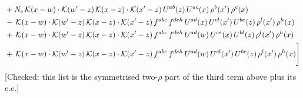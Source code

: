\documentclass[9pt]{article}
\numberwithin{equation}{section}
\begin{document}
\begin{align}
&+N_{c}\,\mathcal{K}(x-w)\cdot\mathcal{K}(w'-z)\,\mathcal{K}(x-z)\cdot\mathcal{K}(x'-z)\,U^{ab}(z)\,U^{ac}(x)\,\rho^{b}(x')\,\rho^{c}(x)\notag \\ 
&-\,\mathcal{K}(x-w)\cdot\mathcal{K}(w'-z)\,\mathcal{K}(x-z)\cdot\mathcal{K}(x'-z)\,f^{abc}\,f^{deh}\,U^{ad}(x)\,U^{cl}(x')\,U^{be}(z)\,\rho^{l}(x')\,\rho^{h}(x)\notag \\ 
&+\,\mathcal{K}(x-w)\cdot\mathcal{K}(w'-z)\,\mathcal{K}(x-z)\cdot\mathcal{K}(x'-z)\,f^{abc}\,f^{deh}\,U^{ad}(w)\,U^{ce}(x)\,U^{bl}(z)\,\rho^{l}(x')\,\rho^{h}(x)\notag \\ 
&+\,\mathcal{K}(x-w)\cdot\mathcal{K}(w'-z)\,\mathcal{K}(x-z)\cdot\mathcal{K}(x'-z)\,f^{abc}\,f^{deh}\,U^{ad}(w)\,U^{cl}(x')\,U^{be}(z)\,\rho^{l}(x')\,\rho^{h}(x)\Bigg]
\end{align} {\color{red}[Checked: this list is the symmetrised two-$\rho$ part of the third term above plus its c.c.]}\par\noindent
\end{document}
